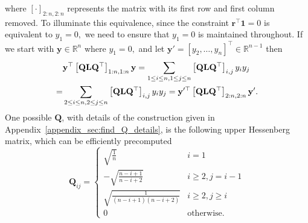 \documentclass[nohyperref]{article}
\theoremstyle{plain}
\theoremstyle{definition}
\theoremstyle{remark}
\begin{document}
where $\left[\cdot\right]_{2:n,2:n}$ represents the matrix with its first row and first column removed. 
To illuminate this equivalence, since the constraint $\mathbf{r}^\top \mathbf{1}=0$ is equivalent to $y_1=0,$ we need to ensure that $y_1=0$ is maintained throughout. If we start with $\mathbf{y}\in\mathbb{R}^n$ where $y_1=0,$ and let $\mathbf{y}'=[y_2, \dots,y_n]^\top \in \mathbb{R}^{n-1}$ then \begin{align*}\vspace{-3mm}
&\mathbf{y}^\top \left[ \mathbf{Q} \mathbf{L} \mathbf{Q}^\top\right]_{1:n,1:n} \mathbf{y}=\sum_{1\leq i \leq n, 1\leq j \leq n}\left[ \mathbf{Q} \mathbf{L} \mathbf{Q}^\top\right]_{i,j}y_iy_j \\ = & \sum_{2\leq i \leq n, 2\leq j \leq n}\left[ \mathbf{Q} \mathbf{L} \mathbf{Q}^\top\right]_{i,j}y_iy_j
= \mathbf{y}'^\top \left[ \mathbf{Q} \mathbf{L} \mathbf{Q}^\top\right]_{2:n,2:n} \mathbf{y}'.
\end{align*} 
One possible $\mathbf{Q}$, with details of the construction given in Appendix~\ref{appendix_sec:find_Q_details}, is
the following upper Hessenberg matrix, 
which
can be efficiently precomputed
\begin{equation*}
\mathbf{Q}_{ij} = \begin{cases}
\sqrt{\frac{1}{n}} & i=1 \\
-\sqrt{\frac{n-i+1}{n-i+2}} & i\geq 2, j=i-1 \\
\sqrt{\frac{1}{(n-i+1)(n-i+2)}} & i\geq 2, j\geq i \\
0 & \text{otherwise.}
\end{cases}
\end{equation*}
\end{document}
